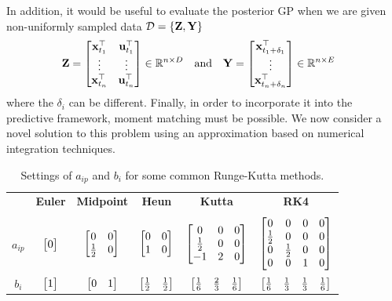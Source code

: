 In addition, it would be useful to evaluate the posterior GP when we are given non-uniformly sampled data $\mathcal{D} = \{\mathbf{Z},\mathbf{Y}\}$
\begin{align}
\mathbf{Z} &= \begin{bmatrix}  \mathbf{x}_{t_1}^\top & \mathbf{u}_{t_1}^\top \\ \vdots & \vdots \\ \mathbf{x}_{t_n}^\top & \mathbf{u}_{t_n}^\top \end{bmatrix} \in \mathbb{R}^{n \times D} &\text{and}
&& \mathbf{Y} &= \begin{bmatrix}  \mathbf{x}_{t_1+\delta_{1}}^\top \\ \vdots \\ \mathbf{x}_{t_n+\delta_n}^\top  \end{bmatrix} \in \mathbb{R}^{n\times E} \label{eqn:cD}
\end{align}
where the $\delta_i$ can be different. Finally, in order to incorporate it into the predictive framework, moment matching must be possible. We now consider a novel solution to this problem using an approximation based on numerical integration techniques.




\begin{table}
\renewcommand{\arraystretch}{1.25}
\begin{center}
\small
\begin{tabular}{ c | ccccc }
\toprule[1.5pt] 
& {\bf Euler } & {\bf Midpoint } & {\bf Heun } & {\bf Kutta } & {\bf RK4 }  \\
\cline{1-6}\\[-2.5ex]
$a_{ip}$
& $\begin{bmatrix} 0 \end{bmatrix}$
& $\begin{bmatrix} 0 & 0 \\ \tfrac{1}{2} & 0 \end{bmatrix}$ 
& $\begin{bmatrix} 0 & 0 \\ 1 & 0 \end{bmatrix}$
& $\begin{bmatrix} 0 & 0 & 0 \\ \tfrac{1}{2} & 0 & 0 \\ -1 & 2 & 0 \end{bmatrix}$
& $\begin{bmatrix} 0 & 0 & 0 & 0 \\  \tfrac{1}{2} & 0 & 0 & 0 \\ 0 & \tfrac{1}{2} & 0 & 0 \\ 0 & 0 & 1 & 0 \end{bmatrix}$ \\[6ex]
$b_{i}$
& $\begin{bmatrix} 1 \end{bmatrix}$
& $\begin{bmatrix} 0 & 1 \end{bmatrix}$ 
& $\begin{bmatrix} \tfrac{1}{2} & \tfrac{1}{2} \end{bmatrix}$ 
& $\begin{bmatrix} \tfrac{1}{6} & \tfrac{2}{3} & \tfrac{1}{6} \end{bmatrix}$ 
& $\begin{bmatrix} \tfrac{1}{6} & \tfrac{1}{3} & \tfrac{1}{3} & \tfrac{1}{6} \end{bmatrix}$  \\[1ex]
\bottomrule[1.5pt]
\end{tabular}
\end{center}
\caption{Settings of $a_{ip}$ and $b_i$ for some common Runge-Kutta methods.}
\label{tab:RKmeths}
\end{table}



